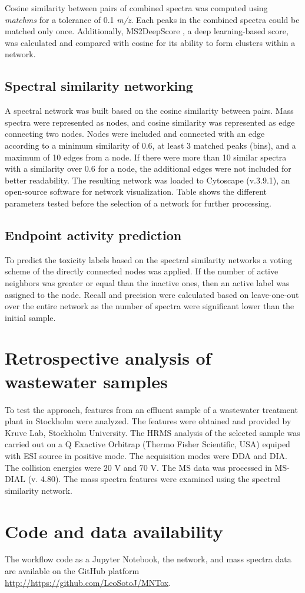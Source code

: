 Cosine similarity between pairs of combined spectra was computed using \textit{matchms} for a tolerance of 0.1 \textit{m/z}. Each peaks in the combined spectra could be matched only once. Additionally, MS2DeepScore \cite{huber_MS2deepscore_2021}, a deep learning-based score, was calculated and compared with cosine for its ability to form clusters within a network.

\subsection*{Spectral similarity networking}

A spectral network was built based on the cosine similarity between pairs. Mass spectra were represented as nodes, and cosine similarity was represented as edge connecting two nodes. Nodes were included and connected with an edge according to a minimum similarity of 0.6, at least 3 matched peaks (bins), and a maximum of 10 edges from a node. If there were more than 10 similar spectra with a similarity over 0.6 for a node, the additional edges were not included for better readability. The resulting network was loaded to  Cytoscape (v.3.9.1), an open-source software for network visualization. Table  shows the different parameters tested before the selection of a network for further processing. 

\subsection*{Endpoint activity prediction}

To predict the toxicity labels based on the spectral similarity networks a voting scheme of the directly connected nodes was applied. If the number of active neighbors was greater or equal than the inactive ones, then an active label was assigned to the node. Recall and precision were calculated  based on leave-one-out over the entire network as the number of spectra were significant lower than the initial sample.

\section*{Retrospective analysis of wastewater samples}

To test the approach, \tMS{} features from an effluent sample of a wastewater treatment plant in Stockholm were analyzed. The \tMS{} features were obtained and provided by Kruve Lab, Stockholm University. The HRMS analysis of the selected sample was carried out on a Q Exactive Orbitrap (Thermo Fisher Scientific, USA) equiped with \ac{ESI} source in positive mode. The acquisition modes were \ac{DDA} and \ac{DIA}. The collision energies were 20 V and 70 V. The MS data was processed in MS-DIAL (v. 4.80). The mass spectra features were examined using the spectral similarity network. 

\section*{Code and data availability}

The workflow code as a Jupyter Notebook, the network, and mass spectra data are available on the GitHub platform \href{https://github.com/LeoSotoJ/MNTox}{http://https://github.com/LeoSotoJ/MNTox}.

